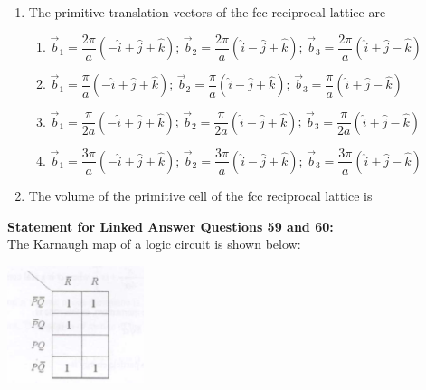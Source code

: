 \documentclass[14pt, a4paper]{extarticle}
\begin{document}
\begin{enumerate}[label=\textbf{Q. \arabic*}, start=57]

\item The primitive translation vectors of the fcc reciprocal lattice are
\begin{enumerate}[label=(\Alph*)]
\item $\vec{b}_1 = \dfrac{2\pi}{a}(-\hat{i}+\hat{j}+\hat{k})$; $\vec{b}_2 = \dfrac{2\pi}{a}(\hat{i}-\hat{j}+\hat{k})$; $\vec{b}_3 = \dfrac{2\pi}{a}(\hat{i}+\hat{j}-\hat{k})$
\item $\vec{b}_1 = \dfrac{\pi}{a}(-\hat{i}+\hat{j}+\hat{k})$; $\vec{b}_2 = \dfrac{\pi}{a}(\hat{i}-\hat{j}+\hat{k})$; $\vec{b}_3 = \dfrac{\pi}{a}(\hat{i}+\hat{j}-\hat{k})$
\item $\vec{b}_1 = \dfrac{\pi}{2a}(-\hat{i}+\hat{j}+\hat{k})$; $\vec{b}_2 = \dfrac{\pi}{2a}(\hat{i}-\hat{j}+\hat{k})$; $\vec{b}_3 = \dfrac{\pi}{2a}(\hat{i}+\hat{j}-\hat{k})$
\item $\vec{b}_1 = \dfrac{3\pi}{a}(-\hat{i}+\hat{j}+\hat{k})$; $\vec{b}_2 = \dfrac{3\pi}{a}(\hat{i}-\hat{j}+\hat{k})$; $\vec{b}_3 = \dfrac{3\pi}{a}(\hat{i}+\hat{j}-\hat{k})$
\end{enumerate}

\item The volume of the primitive cell of the fcc reciprocal lattice is
\begin{enumerate}[label=(\Alph*)]
\end{enumerate}

\end{enumerate}

\vspace{1.5em}
\noindent
\textbf{Statement for Linked Answer Questions 59 and 60:} \\
The Karnaugh map of a logic circuit is shown below:
    \begin{center}
        \includegraphics[width=0.3\textwidth]{figs/Q59-60fig.png}
        \label{fig:q59-60}
    \end{center}
\end{document}
